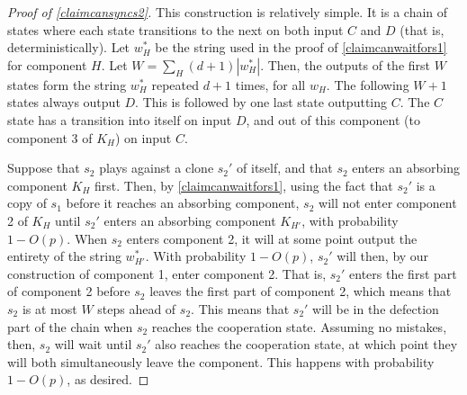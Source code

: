 \documentclass[12pt]{article}
\theoremstyle{definition}
\theoremstyle{remark}
\begin{document}
      \begin{proof}[Proof of \cref{claimcansyncs2}]
        This construction is relatively simple. It is a chain of states where each state transitions to the next on both input $C$ and $D$ (that is, deterministically). Let $w_H^*$ be the string used in the proof of \cref{claimcanwaitfors1} for component $H$. Let $W = \sum_{H} (d+1) | w_H^* |$. Then, the outputs of the first $W$ states form the string $w_H^*$ repeated $d+1$ times, for all $w_H$. The following $W+1$ states always output $D$. This is followed by one last state outputting $C$. The $C$ state has a transition into itself on input $D$, and out of this component (to component 3 of $K_H$) on input $C$.

        Suppose that $s_2$ plays against a clone $s_2'$ of itself, and that $s_2$ enters an absorbing component $K_H$ first. Then, by \cref{claimcanwaitfors1}, using the fact that $s_2'$ is a copy of $s_1$ before it reaches an absorbing component, $s_2$ will not enter component 2 of $K_H$ until $s_2'$ enters an absorbing component $K_{H'}$, with probability $1 - O(p)$. When $s_2$ enters component 2, it will at some point output the entirety of the string $w_{H'}^*$. With probability $1 - O(p)$, $s_2'$ will then, by our construction of component 1, enter component 2. That is, $s_2'$ enters the first part of component 2 before $s_2$ leaves the first part of component 2, which means that $s_2$ is at most $W$ steps ahead of $s_2$. This means that $s_2'$ will be in the defection part of the chain when $s_2$ reaches the cooperation state. Assuming no mistakes, then, $s_2$ will wait until $s_2'$ also reaches the cooperation state, at which point they will both simultaneously leave the component. This happens with probability $1 - O(p)$, as desired.
      \end{proof}
\end{document}
